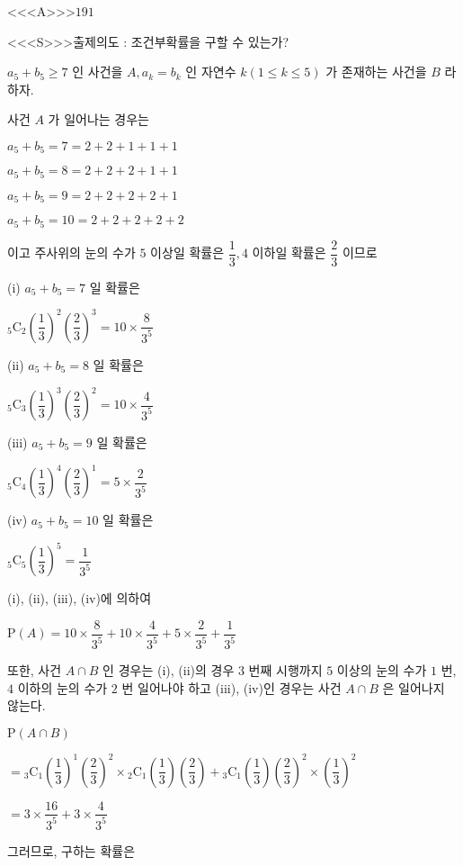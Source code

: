 \documentclass{oblivoir}
\begin{document}
<<<A>>>$191$

<<<S>>>출제의도 : 조건부확률을 구할 수 있는가?

$a_{5}+b_{5} \geq 7$ 인 사건을 $A, a_{k}=b_{k}$ 인 자연수 $k(1 \leq k \leq 5)$ 가 존재하는 사건을 $B$ 라 하자.

사건 $A$ 가 일어나는 경우는

$a_{5}+b_{5}=7=2+2+1+1+1$

$a_{5}+b_{5}=8=2+2+2+1+1$

$a_{5}+b_{5}=9=2+2+2+2+1$

$a_{5}+b_{5}=10=2+2+2+2+2$

이고 주사위의 눈의 수가 $5$ 이상일 확률은 $\dfrac{1}{3}, 4$ 이하일 확률은 $\dfrac{2}{3}$ 이므로

(i) $a_{5}+b_{5}=7$ 일 확률은

${ }_{5} \mathrm{C}_{2}\left(\dfrac{1}{3}\right)^{2}\left(\dfrac{2}{3}\right)^{3}=10 \times \dfrac{8}{3^{5}}$

(ii) $a_{5}+b_{5}=8$ 일 확률은

${ }_{5} \mathrm{C}_{3}\left(\dfrac{1}{3}\right)^{3}\left(\dfrac{2}{3}\right)^{2}=10 \times \dfrac{4}{3^{5}}$

(iii) $a_{5}+b_{5}=9$ 일 확률은

${ }_{5} \mathrm{C}_{4}\left(\dfrac{1}{3}\right)^{4}\left(\dfrac{2}{3}\right)^{1}=5 \times \dfrac{2}{3^{5}}$

(iv) $a_{5}+b_{5}=10$ 일 확률은

${ }_{5} \mathrm{C}_{5}\left(\dfrac{1}{3}\right)^{5}=\dfrac{1}{3^{5}}$

(i), (ii), (iii), (iv)에 의하여

$\mathrm{P}(A)=10 \times \dfrac{8}{3^{5}}+10 \times \dfrac{4}{3^{5}}+5 \times \dfrac{2}{3^{5}}+\dfrac{1}{3^{5}}$

또한, 사건 $A \cap B$ 인 경우는 (i), (ii)의 경우 $3$ 번째 시행까지 $5$ 이상의 눈의 수가 $1$ 번, $4$ 이하의 눈의 수가 $2$ 번 일어나야 하고 (iii), (iv)인 경우는 사건 $A \cap B$ 은 일어나지 않는다.

$\mathrm{P}(A \cap B)$

$={ }_{3} \mathrm{C}_{1}\left(\dfrac{1}{3}\right)^{1}\left(\dfrac{2}{3}\right)^{2} \times{ }_{2} \mathrm{C}_{1}\left(\dfrac{1}{3}\right)\left(\dfrac{2}{3}\right) +{ }_{3} \mathrm{C}_{1}\left(\dfrac{1}{3}\right)\left(\dfrac{2}{3}\right)^{2} \times\left(\dfrac{1}{3}\right)^{2} $

$=3 \times \dfrac{16}{3^{5}}+3 \times \dfrac{4}{3^{5}}$

그러므로, 구하는 확률은
\end{document}
